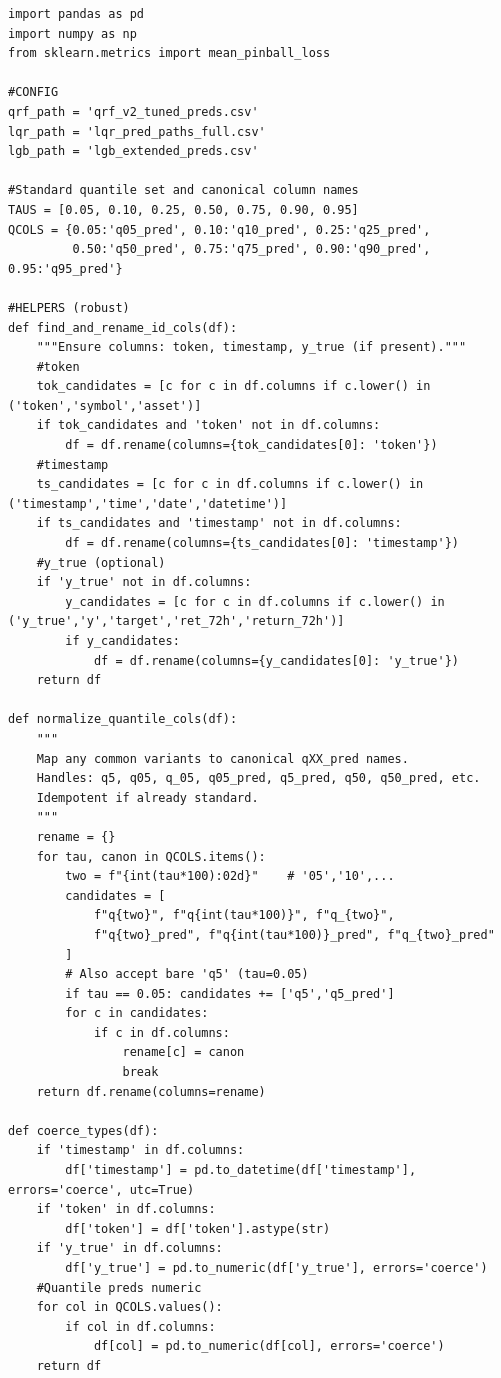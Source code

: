 \documentclass[
  a4paper,
  DIV=11,
  numbers=noendperiod]{scrreprt}
\begin{document}
\begin{verbatim}
import pandas as pd
import numpy as np
from sklearn.metrics import mean_pinball_loss

#CONFIG 
qrf_path = 'qrf_v2_tuned_preds.csv'
lqr_path = 'lqr_pred_paths_full.csv'
lgb_path = 'lgb_extended_preds.csv'

#Standard quantile set and canonical column names
TAUS = [0.05, 0.10, 0.25, 0.50, 0.75, 0.90, 0.95]
QCOLS = {0.05:'q05_pred', 0.10:'q10_pred', 0.25:'q25_pred',
         0.50:'q50_pred', 0.75:'q75_pred', 0.90:'q90_pred', 0.95:'q95_pred'}

#HELPERS (robust) 
def find_and_rename_id_cols(df):
    """Ensure columns: token, timestamp, y_true (if present)."""
    #token
    tok_candidates = [c for c in df.columns if c.lower() in ('token','symbol','asset')]
    if tok_candidates and 'token' not in df.columns:
        df = df.rename(columns={tok_candidates[0]: 'token'})
    #timestamp
    ts_candidates = [c for c in df.columns if c.lower() in ('timestamp','time','date','datetime')]
    if ts_candidates and 'timestamp' not in df.columns:
        df = df.rename(columns={ts_candidates[0]: 'timestamp'})
    #y_true (optional)
    if 'y_true' not in df.columns:
        y_candidates = [c for c in df.columns if c.lower() in ('y_true','y','target','ret_72h','return_72h')]
        if y_candidates:
            df = df.rename(columns={y_candidates[0]: 'y_true'})
    return df

def normalize_quantile_cols(df):
    """
    Map any common variants to canonical qXX_pred names.
    Handles: q5, q05, q_05, q05_pred, q5_pred, q50, q50_pred, etc.
    Idempotent if already standard.
    """
    rename = {}
    for tau, canon in QCOLS.items():
        two = f"{int(tau*100):02d}"    # '05','10',...
        candidates = [
            f"q{two}", f"q{int(tau*100)}", f"q_{two}",
            f"q{two}_pred", f"q{int(tau*100)}_pred", f"q_{two}_pred"
        ]
        # Also accept bare 'q5' (tau=0.05)
        if tau == 0.05: candidates += ['q5','q5_pred']
        for c in candidates:
            if c in df.columns:
                rename[c] = canon
                break
    return df.rename(columns=rename)

def coerce_types(df):
    if 'timestamp' in df.columns:
        df['timestamp'] = pd.to_datetime(df['timestamp'], errors='coerce', utc=True)
    if 'token' in df.columns:
        df['token'] = df['token'].astype(str)
    if 'y_true' in df.columns:
        df['y_true'] = pd.to_numeric(df['y_true'], errors='coerce')
    #Quantile preds numeric
    for col in QCOLS.values():
        if col in df.columns:
            df[col] = pd.to_numeric(df[col], errors='coerce')
    return df


\end{verbatim}
\end{document}
